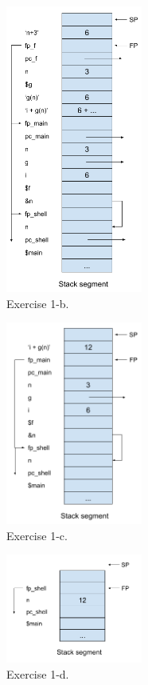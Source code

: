 \documentclass[a4paper,11pt]{report}
\begin{document}
\begin{figure}[ht]
  \centering
  \includegraphics[width=0.4\textwidth]{figures/SOP_s05_ex1_b}
  \caption{\label{fig:ex1-a} Exercise 1-b.}
\end{figure}

\begin{figure}[ht]
  \centering
  \includegraphics[width=0.4\textwidth]{figures/SOP_s05_ex1_c}
  \caption{\label{fig:ex1-a} Exercise 1-c.}
\end{figure}

\begin{figure}[ht]
  \centering
  \includegraphics[width=0.4\textwidth]{figures/SOP_s05_ex1_d}
  \caption{\label{fig:ex1-a} Exercise 1-d.}
\end{figure}
\end{document}
